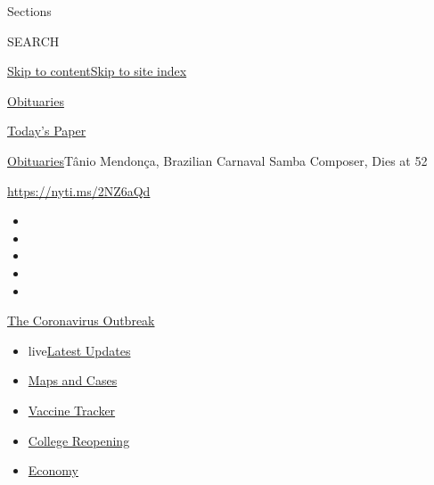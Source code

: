 Sections

SEARCH

\protect\hyperlink{site-content}{Skip to
content}\protect\hyperlink{site-index}{Skip to site index}

\href{https://www.nytimes3xbfgragh.onion/section/obituaries}{Obituaries}

\href{https://myaccount.nytimes3xbfgragh.onion/auth/login?response_type=cookie\&client_id=vi}{}

\href{https://www.nytimes3xbfgragh.onion/section/todayspaper}{Today's
Paper}

\href{/section/obituaries}{Obituaries}\textbar{}Tânio Mendonça,
Brazilian Carnaval Samba Composer, Dies at 52

\url{https://nyti.ms/2NZ6aQd}

\begin{itemize}
\item
\item
\item
\item
\item
\end{itemize}

\href{https://www.nytimes3xbfgragh.onion/news-event/coronavirus?action=click\&pgtype=Article\&state=default\&region=TOP_BANNER\&context=storylines_menu}{The
Coronavirus Outbreak}

\begin{itemize}
\tightlist
\item
  live\href{https://www.nytimes3xbfgragh.onion/2020/08/04/world/coronavirus-covid-19.html?action=click\&pgtype=Article\&state=default\&region=TOP_BANNER\&context=storylines_menu}{Latest
  Updates}
\item
  \href{https://www.nytimes3xbfgragh.onion/interactive/2020/us/coronavirus-us-cases.html?action=click\&pgtype=Article\&state=default\&region=TOP_BANNER\&context=storylines_menu}{Maps
  and Cases}
\item
  \href{https://www.nytimes3xbfgragh.onion/interactive/2020/science/coronavirus-vaccine-tracker.html?action=click\&pgtype=Article\&state=default\&region=TOP_BANNER\&context=storylines_menu}{Vaccine
  Tracker}
\item
  \href{https://www.nytimes3xbfgragh.onion/2020/08/02/us/covid-college-reopening.html?action=click\&pgtype=Article\&state=default\&region=TOP_BANNER\&context=storylines_menu}{College
  Reopening}
\item
  \href{https://www.nytimes3xbfgragh.onion/live/2020/08/03/business/stock-market-today-coronavirus?action=click\&pgtype=Article\&state=default\&region=TOP_BANNER\&context=storylines_menu}{Economy}
\end{itemize}

